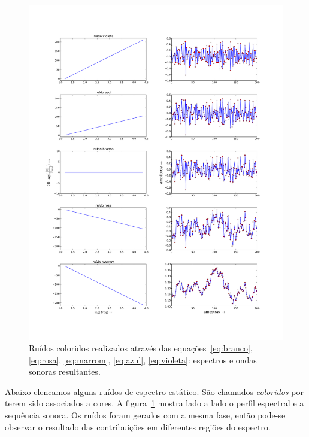 \begin{figure}[htpq!]
    \centering
        \includegraphics[width=\textwidth]{figuras/ruidos___}
    \caption{Ruídos coloridos realizados através das equações~\ref{eq:branco}, \ref{eq:rosa}, \ref{eq:marrom}, \ref{eq:azul}, \ref{eq:violeta}: espectros e ondas sonoras resultantes.}
        \label{fig:ruidos}
\end{figure}


Abaixo elencamos alguns ruídos de espectro estático. São chamados \emph{coloridos} por terem sido associados a cores. 
A figura~\ref{fig:ruidos} mostra lado a lado o perfil espectral e
a sequência sonora. Os ruídos foram gerados com a mesma fase, então
pode-se observar o resultado das contribuições em diferentes regiões do espectro.

